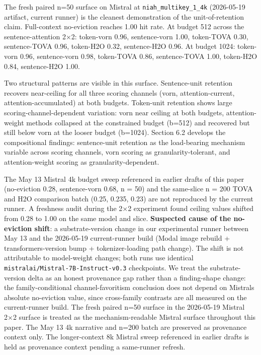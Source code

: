 \documentclass[
]{article}
\begin{document}
The fresh paired n=50 surface on Mistral at
\texttt{niah\_multikey\_1\_4k} (2026-05-19 artifact, current runner) is
the cleanest demonstration of the unit-of-retention claim. Full-context
no-eviction reaches 1.00 hit rate. At budget 512 across the
sentence-attention 2×2: token-vorn 0.96, sentence-vorn 1.00,
token-TOVA 0.30, sentence-TOVA 0.96, token-H2O 0.32,
sentence-H2O 0.96. At budget 1024: token-vorn 0.96, sentence-vorn
0.98, token-TOVA 0.86, sentence-TOVA 1.00, token-H2O
0.84, sentence-H2O 1.00.

Two structural patterns are visible in this surface. Sentence-unit
retention recovers near-ceiling for all three scoring channels
(vorn, attention-current, attention-accumulated) at both
budgets. Token-unit retention shows large scoring-channel-dependent
variation: vorn near ceiling at both budgets, attention-weight methods
collapsed at the constrained budget (b=512) and recovered but still
below vorn at the looser budget (b=1024). Section 6.2 develops the
compositional findings: sentence-unit retention as the load-bearing
mechanism variable across scoring channels, vorn scoring
as granularity-tolerant, and attention-weight scoring as
granularity-dependent.

The May 13 Mistral 4k budget sweep referenced in earlier drafts of this
paper (no-eviction 0.28, sentence-vorn 0.68, n = 50) and the same-slice
n = 200 TOVA and H2O comparison batch (0.25, 0.235, 0.23)
are not reproduced by the current runner. A freshness audit during the
2×2 experiment found ceiling values shifted from 0.28 to 1.00 on the
same model and slice. \textbf{Suspected cause of the no-eviction shift}:
a substrate-version change in our experimental runner between May 13 and
the 2026-05-19 current-runner build (Modal image rebuild +
transformers-version bump + tokenizer-loading path change). The shift is
not attributable to model-weight changes; both runs use identical
\texttt{mistralai/\allowbreak{}Mistral-7B-Instruct-v0.\allowbreak{}3} checkpoints. We treat the
substrate-version delta as an honest provenance gap rather than a
finding-shape change: the family-conditional channel-favoritism
conclusion does not depend on Mistral\textquotesingle s absolute
no-eviction value, since cross-family contrasts are all measured on the
current-runner build. The fresh paired n=50 surface in the 2026-05-19
Mistral 2×2 surface is treated as the mechanism-readable Mistral surface
throughout this paper. The May 13 4k narrative and n=200 batch are
preserved as provenance context only. The longer-context 8k Mistral
sweep referenced in earlier drafts is held as provenance context pending
a same-runner refresh.
\end{document}
